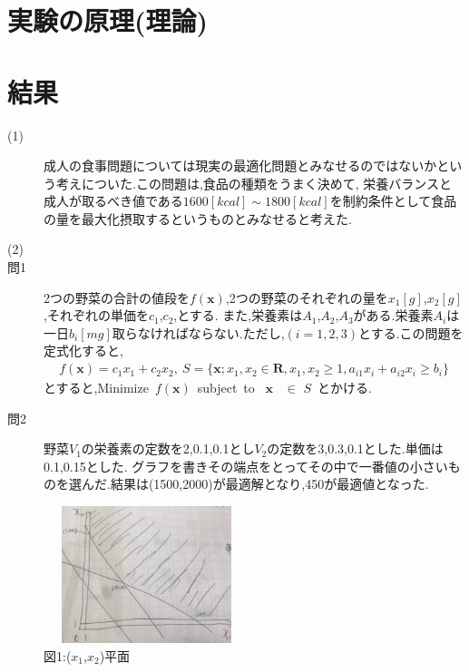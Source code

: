 \documentclass[12pt]{jarticle}
\begin{document}

\section{実験の原理(理論)}


\section{結果}
\begin{description}
	\item[(1)] 成人の食事問題については現実の最適化問題とみなせるのではないかという考えについた.この問題は,食品の種類をうまく決めて,
	      栄養バランスと成人が取るべき値である$1600[kcal]\sim 1800[kcal]$を制約条件として食品の量を最大化摂取するというものとみなせると考えた.
	\item[(2)]
	\item[問1]
	      2つの野菜の合計の値段を$f(\boldsymbol{x})$,2つの野菜のそれぞれの量を$x_1[g]$,$x_2[g]$,それぞれの単価を$c_1$,$c_2$,とする.
	      また,栄養素は$A_1$,$A_2$,$A_3$がある.栄養素$A_i$は一日$b_i[mg]$取らなければならない.ただし,$(i=1,2,3)$とする.この問題を定式化すると,
	      \begin{eqnarray}
		      f(\boldsymbol{x})=c_1 x_1 +c_2 x_2, \ S=\{\boldsymbol{x};x_1,x_2\in \boldsymbol{R},x_1,x_2\geq 1,a_{i1} x_i+a_{i2}x_i\geq b_i\}\nonumber
	      \end{eqnarray}
	      とすると,Minimize\ $f(\boldsymbol{x})$\ subject\ to \ $\boldsymbol{x}$ \ $\in$ $S$\ とかける.
	\item[問2] 野菜$V_1$の栄養素の定数を2,0.1,0.1とし$V_2$の定数を3,0.3,0.1とした.単価は0.1,0.15とした.
	      グラフを書きその端点をとってその中で一番値の小さいものを選んだ.結果は(1500,2000)が最適解となり,450が最適値となった.
	      \begin{center}
		      \includegraphics[height=4cm,width=6cm]{1.png}\\
		      図1:($x_1$,$x_2$)平面\\
	      \end{center}

\end{description}
\end{document}
